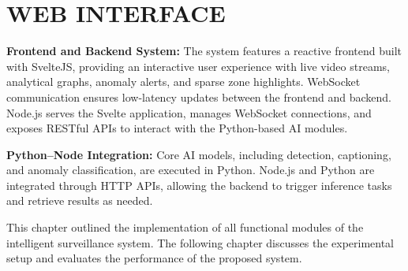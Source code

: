 \section{\MakeUppercase{Web Interface}}

\textbf{Frontend and Backend System:} The system features a reactive frontend built with SvelteJS, providing an interactive user experience with live video streams, analytical graphs, anomaly alerts, and sparse zone highlights. WebSocket communication ensures low-latency updates between the frontend and backend. Node.js serves the Svelte application, manages WebSocket connections, and exposes RESTful APIs to interact with the Python-based AI modules.

\textbf{Python–Node Integration:} Core AI models, including detection, captioning, and anomaly classification, are executed in Python. Node.js and Python are integrated through HTTP APIs, allowing the backend to trigger inference tasks and retrieve results as needed.



\vspace{1em}

This chapter outlined the implementation of all functional modules of the intelligent surveillance system. The following chapter discusses the experimental setup and evaluates the performance of the proposed system.
